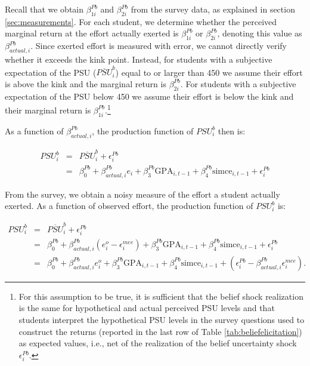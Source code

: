  


Recall that we obtain $\beta^{Pb}_{1i}$ and $\beta^{Pb}_{2i}$ from the survey data, as explained in section \ref{sec:measurements}. For each student, we determine whether the perceived marginal return at the effort actually exerted is $\beta^{Pb}_{1i}$ or $\beta^{Pb}_{2i}$, denoting this value as $\beta_{actual,i}^{Pb}$. Since exerted effort is measured with error, we cannot directly verify whether it exceeds the kink point. Instead, for students with a subjective expectation of the PSU ($\overline{PSU}_i^b$) equal to or larger than 450 we assume their effort is above the kink and the marginal return is $\beta_{2i}^{Pb}$. For students with a subjective expectation of the PSU below 450 we assume their effort is below the kink and their marginal return is $\beta_{1i}^{Pb}$.\footnote{For this assumption to be true, it is sufficient that the belief shock realization is the same for hypothetical and actual perceived PSU levels and that students interpret the hypothetical PSU levels in the survey questions used to construct the returns (reported in the last row of Table \ref{tab:beliefelicitation}) as expected values, i.e., net of the realization of the belief uncertainty shock $\epsilon_{i}^{Pb}$.}\par 








    
\noindent As a function of $\beta_{actual,i}^{Pb}$, the production function of $PSU_i^b$ then is:

\begin{eqnarray*}
PSU_i^b&=&\overline{PSU}_i^b+\epsilon_i^{Pb} \\ \nonumber
&=&\beta_0^{Pb}+\beta_{actual,i}^{Pb}e_i+\beta_3^{Pb}\mbox{GPA}_{i,t-1}+\beta_4^{Pb}\mbox{simce}_{i,t-1}+\epsilon_{i}^{Pb}
\end{eqnarray*}


From the survey, we obtain a noisy measure of the effort a student actually exerted. As a function of observed effort, the production function of $PSU_i^b$ is:

\begin{eqnarray}\label{eq:PSUbobs}
PSU_i^b&=&\overline{PSU}_i^b+\epsilon_i^{Pb} \\ \nonumber
&=&\beta_0^{Pb}+\beta_{actual,i}^{Pb}(e^o_i-\epsilon_i^{mee})+\beta_3^{Pb}\mbox{GPA}_{i,t-1}+\beta_4^{Pb}\mbox{simce}_{i,t-1}+\epsilon_{i}^{Pb}\\ \nonumber 
&=& \beta_0^{Pb}+\beta_{actual,i}^{Pb}e^o_i+\beta_3^{Pb}\mbox{GPA}_{i,t-1}+\beta_4^{Pb}\mbox{simce}_{i,t-1}+(\epsilon_i^{Pb}-\beta^{Pb}_{actual,i}\epsilon_i^{mee}).
\end{eqnarray}


